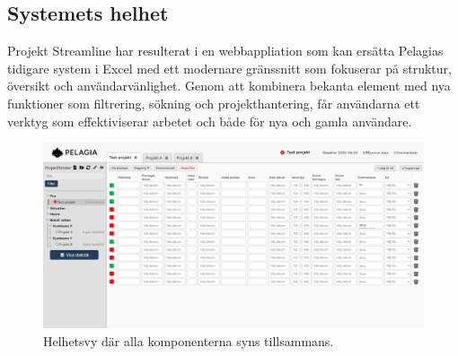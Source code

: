 \subsection{Systemets helhet}
Projekt Streamline har resulterat i en webbappliation som kan ersätta Pelagias tidigare system i Excel med ett modernare gränssnitt
som fokuserar på struktur, översikt och användarvänlighet. Genom att kombinera bekanta element med nya funktioner som filtrering, sökning och projekthantering,
får användarna ett verktyg som effektiviserar arbetet och både för nya och gamla användare.

\begin{figure}[H]
    \centering
    \includegraphics[width=1\linewidth]{images/helhet.png}
    \caption{Helhetsvy där alla komponenterna syns tillsammans.}
\end{figure}
